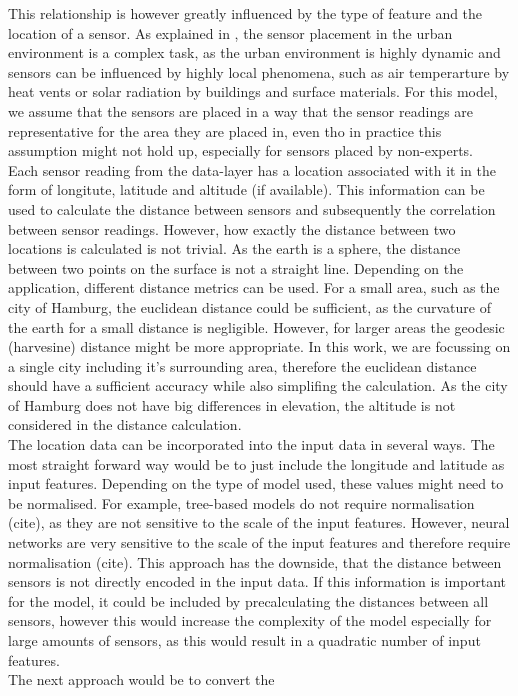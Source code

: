 This relationship is however greatly influenced by the type of feature and the location of a sensor. As explained in \cite{oke2006guideline}, the sensor placement in the urban environment is a complex task, as the urban environment is highly dynamic and sensors can be influenced by highly local phenomena, such as air temperarture by heat vents or solar radiation by buildings and surface materials. For this model, we assume that the sensors are placed in a way that the sensor readings are representative for the area they are placed in, even tho in practice this assumption might not hold up, especially for sensors placed by non-experts.\\
Each sensor reading from the data-layer has a location associated with it in the form of longitute, latitude and altitude (if available). This information can be used to calculate the distance between sensors and subsequently the correlation between sensor readings. However, how exactly the distance between two locations is calculated is not trivial. As the earth is a sphere, the distance between two points on the surface is not a straight line. Depending on the application, different distance metrics can be used. For a small area, such as the city of Hamburg, the euclidean distance could be sufficient, as the curvature of the earth for a small distance is negligible. However, for larger areas the geodesic (harvesine) distance might be more appropriate. In this work, we are focussing on a single city including it's surrounding area, therefore the euclidean distance should have a sufficient accuracy while also simplifing the calculation. As the city of Hamburg does not have big differences in elevation, the altitude is not considered in the distance calculation.\\
The location data can be incorporated into the input data in several ways. The most straight forward way would be to just include the longitude and latitude as input features. Depending on the type of model used, these values might need to be normalised. For example, tree-based models do not require normalisation (cite), as they are not sensitive to the scale of the input features. However, neural networks are very sensitive to the scale of the input features and therefore require normalisation (cite). This approach has the downside, that the distance between sensors is not directly encoded in the input data. If this information is important for the model, it could be included by precalculating the distances between all sensors, however this would increase the complexity of the model especially for large amounts of sensors, as this would result in a quadratic number of input features.\\
The next approach would be to convert the 

